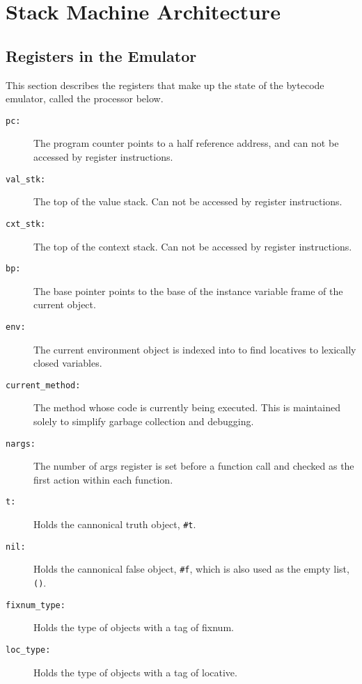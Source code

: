 \chapter{Stack Machine Architecture}


\section{Registers in the Emulator}

This section describes the registers that make up the state of the
bytecode emulator, called the processor below.

\begin{description}

\item[\tt pc:] The program counter points to a half reference
address, and can not be accessed by register instructions.

\item[\tt val\_stk:] The top of the value stack.  Can not be accessed by
register instructions.

\item[\tt cxt\_stk:] The top of the context stack.  Can not be accessed by
register instructions.

\item[\tt bp:] The base pointer points to the base of the instance variable frame
of the current object.

\item[\tt env:] The current environment object is indexed into to find
locatives to lexically closed variables.

\item[\tt current\_method:] The method whose code is currently being
executed.  This is maintained solely to simplify garbage collection
and debugging.

\item[\tt nargs:] The number of args register is set before a function
call and checked as the first action within each function.

\item[\tt t:] Holds the cannonical truth object, {\tt \#t}.

\item[\tt nil:] Holds the cannonical false object, {\tt \#f}, which is also
used as the empty list, {\tt ()}.

\item[\tt fixnum\_type:] Holds the type of objects with a tag of fixnum.

\item[\tt loc\_type:] Holds the type of objects with a tag of locative.


\end{description}
